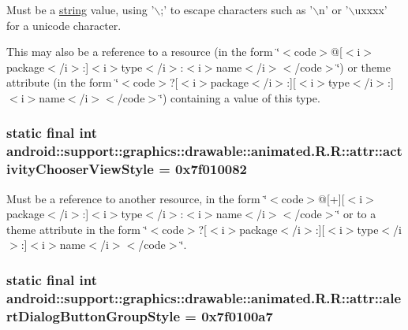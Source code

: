 Must be a \hyperlink{classandroid_1_1support_1_1graphics_1_1drawable_1_1animated_1_1_r_1_1string}{string} value, using '$\backslash$;' to escape characters such as '$\backslash$n' or '$\backslash$uxxxx' for a unicode character. 

This may also be a reference to a resource (in the form \char`\"{}$<$code$>$@\mbox{[}$<$i$>$package$<$/i$>$:\mbox{]}$<$i$>$type$<$/i$>$:$<$i$>$name$<$/i$>$$<$/code$>$\char`\"{}) or theme attribute (in the form \char`\"{}$<$code$>$?\mbox{[}$<$i$>$package$<$/i$>$:\mbox{]}\mbox{[}$<$i$>$type$<$/i$>$:\mbox{]}$<$i$>$name$<$/i$>$$<$/code$>$\char`\"{}) containing a value of this type. \hypertarget{classandroid_1_1support_1_1graphics_1_1drawable_1_1animated_1_1_r_1_1attr_8867c51af861e1508d37d4825402137d}{
\subsubsection[{activityChooserViewStyle}]{\setlength{\rightskip}{0pt plus 5cm}static final int android::support::graphics::drawable::animated.R.R::attr::activityChooserViewStyle = 0x7f010082}}
\label{classandroid_1_1support_1_1graphics_1_1drawable_1_1animated_1_1_r_1_1attr_8867c51af861e1508d37d4825402137d}


Must be a reference to another resource, in the form \char`\"{}$<$code$>$@\mbox{[}+\mbox{]}\mbox{[}$<$i$>$package$<$/i$>$:\mbox{]}$<$i$>$type$<$/i$>$:$<$i$>$name$<$/i$>$$<$/code$>$\char`\"{} or to a theme attribute in the form \char`\"{}$<$code$>$?\mbox{[}$<$i$>$package$<$/i$>$:\mbox{]}\mbox{[}$<$i$>$type$<$/i$>$:\mbox{]}$<$i$>$name$<$/i$>$$<$/code$>$\char`\"{}. \hypertarget{classandroid_1_1support_1_1graphics_1_1drawable_1_1animated_1_1_r_1_1attr_535b0ef16b7140bcfb6f40fbbb24ec9f}{
\subsubsection[{alertDialogButtonGroupStyle}]{\setlength{\rightskip}{0pt plus 5cm}static final int android::support::graphics::drawable::animated.R.R::attr::alertDialogButtonGroupStyle = 0x7f0100a7}}
\label{classandroid_1_1support_1_1graphics_1_1drawable_1_1animated_1_1_r_1_1attr_535b0ef16b7140bcfb6f40fbbb24ec9f}


